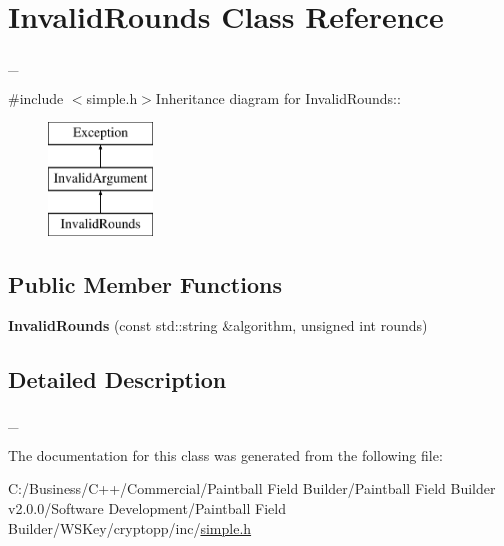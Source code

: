 \hypertarget{class_invalid_rounds}{
\section{InvalidRounds Class Reference}
\label{class_invalid_rounds}
}


\_\-  


{\ttfamily \#include $<$simple.h$>$}Inheritance diagram for InvalidRounds::\begin{figure}[H]
\begin{center}
\leavevmode
\includegraphics[height=3cm]{class_invalid_rounds}
\end{center}
\end{figure}
\subsection*{Public Member Functions}
\begin{DoxyCompactItemize}
\item 
\hypertarget{class_invalid_rounds_ab9d6a833982c464e81644d2a237b00df}{
{\bfseries InvalidRounds} (const std::string \&algorithm, unsigned int rounds)}
\label{class_invalid_rounds_ab9d6a833982c464e81644d2a237b00df}

\end{DoxyCompactItemize}


\subsection{Detailed Description}
\_\- 

The documentation for this class was generated from the following file:\begin{DoxyCompactItemize}
\item 
C:/Business/C++/Commercial/Paintball Field Builder/Paintball Field Builder v2.0.0/Software Development/Paintball Field Builder/WSKey/cryptopp/inc/\hyperlink{simple_8h}{simple.h}\end{DoxyCompactItemize}
